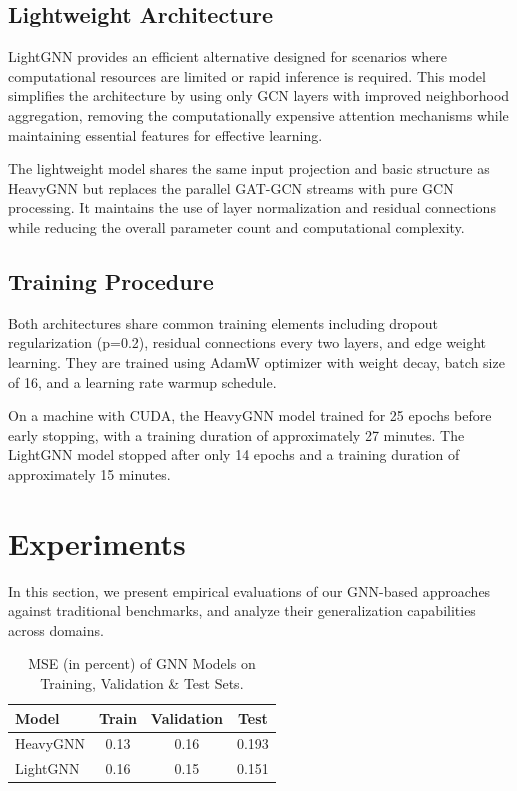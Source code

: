 \documentclass[letterpaper]{article}
\begin{document}
\subsection{Lightweight Architecture}

LightGNN provides an efficient alternative designed for scenarios where computational resources are limited or rapid inference is required. This model simplifies the architecture by using only GCN layers with improved neighborhood aggregation, removing the computationally expensive attention mechanisms while maintaining essential features for effective learning.

The lightweight model shares the same input projection and basic structure as HeavyGNN but replaces the parallel GAT-GCN streams with pure GCN processing. It maintains the use of layer normalization and residual connections while reducing the overall parameter count and computational complexity.

\subsection{Training Procedure}

Both architectures share common training elements including dropout regularization (p=0.2), residual connections every two layers, and edge weight learning. They are trained using AdamW optimizer with weight decay, batch size of 16, and a learning rate warmup schedule.

On a machine with CUDA, the HeavyGNN model trained for 25 epochs before early stopping, with a training duration of approximately 27 minutes. The LightGNN model stopped after only 14 epochs and a training duration of approximately 15 minutes.

\section{Experiments}
In this section, we present empirical evaluations of our GNN-based approaches against traditional benchmarks, and analyze their generalization capabilities across domains.

\begin{table}[H]
    \centering
    \caption{MSE (in percent) of GNN Models on Training, Validation \& Test Sets.}
    \label{tab:train-test}
    \begin{tabular}{ |l|c|c|c|}
    \hline
    \textbf{Model} & \textbf{Train} & \textbf{Validation} & \textbf{Test} \\
    \hline
    HeavyGNN & 0.13 & 0.16 & 0.193 \\
    LightGNN & 0.16 & 0.15 & 0.151 \\
    \hline
    \end{tabular}
\end{table}
\end{document}
